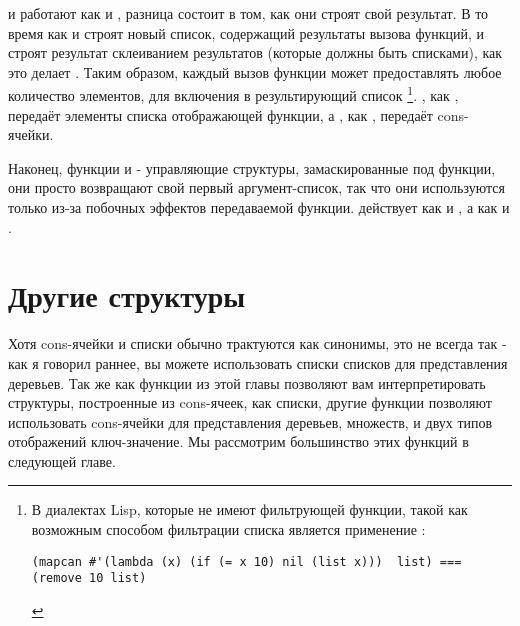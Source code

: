  и  работают как  и , разница состоит
в том, как они строят свой результат. В то время как  и  строят
новый список, содержащий результаты вызова функций,  и  строят
результат склеиванием результатов (которые должны быть списками), как это делает
. Таким образом, каждый вызов функции может предоставлять любое количество
элементов, для включения в результирующий список \footnote{В диалектах Lisp, которые не
  имеют фильтрующей функции, такой как  возможным способом фильтрации списка
  является применение :

\begin{lstlisting}
(mapcan #'(lambda (x) (if (= x 10) nil (list x)))  list) === (remove 10 list)
\end{lstlisting}

}. , как , передаёт элементы списка отображающей функции, а
, как , передаёт cons-ячейки.

Наконец, функции  и  - управляющие структуры, замаскированные под
функции, они просто возвращают свой первый аргумент-список, так что они используются
только из-за побочных эффектов передаваемой функции.  действует как
 и , а  как  и .


\section{Другие структуры}

Хотя cons-ячейки и списки обычно трактуются как синонимы, это не всегда так - как я
говорил раннее, вы можете использовать списки списков для представления деревьев. Так же
как функции из этой главы позволяют вам интерпретировать структуры, построенные из
cons-ячеек, как списки, другие функции позволяют использовать cons-ячейки для
представления деревьев, множеств, и двух типов отображений ключ-значение. Мы рассмотрим
большинство этих функций в следующей главе.

